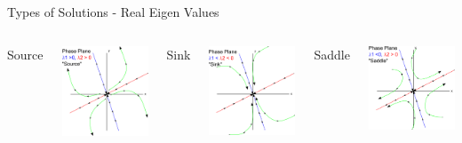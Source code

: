 \begin{frame}{Types of Solutions - Real Eigen Values}

  \begin{columns}

    Source

    \includegraphics[width=3cm]{img/phasePlaneSource}

    Sink

    \includegraphics[width=3cm]{img/phasePlaneSink}

    Saddle

    \includegraphics[width=3cm]{img/phasePlaneSaddle}

  \end{columns}
  
\end{frame}

